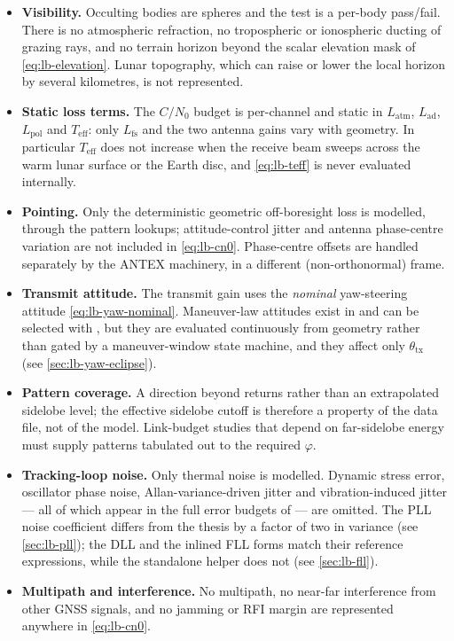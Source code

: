 \begin{itemize}[leftmargin=1.4em]
  \item \textbf{Visibility.}  Occulting bodies are spheres and the test is a
        per-body pass/fail.  There is no atmospheric refraction, no
        tropospheric or ionospheric ducting of grazing rays, and no terrain
        horizon beyond the scalar elevation mask of
        \cref{eq:lb-elevation}.  Lunar topography, which can raise or lower the
        local horizon by several kilometres, is not represented.
  \item \textbf{Static loss terms.}  The $C/N_0$ budget is per-channel and
        static in $L_\mathrm{atm}$, $L_\mathrm{ad}$, $L_\mathrm{pol}$ and
        $T_\mathrm{eff}$: only $L_\mathrm{fs}$ and the two antenna gains vary
        with geometry.  In particular $T_\mathrm{eff}$ does not increase when
        the receive beam sweeps across the warm lunar surface or the Earth
        disc, and \cref{eq:lb-teff} is never evaluated internally.
  \item \textbf{Pointing.}  Only the deterministic geometric off-boresight loss
        is modelled, through the pattern lookups; attitude-control jitter and
        antenna phase-centre variation are not included in
        \cref{eq:lb-cn0}.  Phase-centre offsets are handled separately by the
        ANTEX machinery, in a different (non-orthonormal) frame.
  \item \textbf{Transmit attitude.}  The transmit gain uses the \emph{nominal}
        yaw-steering attitude \eqref{eq:lb-yaw-nominal}.  Maneuver-law
        attitudes exist in  and can be selected with
        , but they are evaluated continuously from
        geometry rather than gated by a maneuver-window state machine, and
        they affect only $\theta_\mathrm{tx}$ (see
        \cref{sec:lb-yaw-eclipse}).
  \item \textbf{Pattern coverage.}  A direction beyond 
        returns  rather than an extrapolated sidelobe level; the
        effective sidelobe cutoff is therefore a property of the data file, not
        of the model.  Link-budget studies that depend on far-sidelobe energy
        must supply patterns tabulated out to the required $\varphi$.
  \item \textbf{Tracking-loop noise.}  Only thermal noise is modelled.
        Dynamic stress error, oscillator phase noise, Allan-variance-driven
        jitter and vibration-induced jitter --- all of which appear in the full
        error budgets of \citet{kaplan2017} --- are omitted.  The PLL noise
        coefficient differs from the thesis by a factor of two in variance (see
        \cref{sec:lb-pll}); the DLL and the inlined FLL forms match their
        reference expressions, while the standalone  helper does
        not (see \cref{sec:lb-fll}).
  \item \textbf{Multipath and interference.}  No multipath, no near-far
        interference from other GNSS signals, and no jamming or RFI margin are
        represented anywhere in \cref{eq:lb-cn0}.
\end{itemize}

